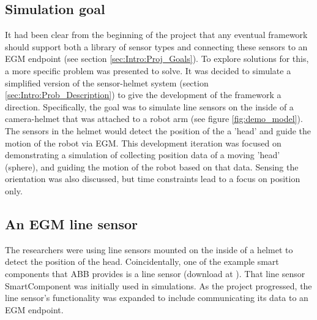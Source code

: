 \documentclass{cslthse-msc}
\begin{document}
\subsection{Simulation goal}
\label{sec:Dev:I2:demo_goal}
It had been clear from the beginning of the project that any eventual framework should support both a library of sensor types and connecting these sensors to an EGM endpoint (see section \ref{sec:Intro:Proj_Goals}). To explore solutions for this, a more specific problem was presented to solve. It was decided to simulate a simplified version of the sensor-helmet system (section \ref{sec:Intro:Prob_Description}) to give the development of the framework a direction. Specifically, the goal was to simulate line sensors on the inside of a camera-helmet that was attached to a robot arm (see figure \ref{fig:demo_model}). The sensors in the helmet would detect the position of the a 'head' and guide the motion of the robot via EGM. This development iteration was focused on demonstrating a simulation of collecting position data of a moving 'head' (sphere), and guiding the motion of the robot based on that data. Sensing the  orientation was also discussed, but time constraints lead to a focus on position only. \par
 
 \subsection{An EGM line sensor}
 \label{sec:Dev:I2:egm_line_sensor}
The researchers were using line sensors mounted on the inside of a helmet to detect the position of the head. Coincidentally, one of the example smart components that ABB provides is a line sensor (download at \cite{ABB:Line_Sensor}). That line sensor SmartComponent was initially used in simulations. As the project progressed, the line sensor's functionality was expanded to include communicating its data to an EGM endpoint. 
\end{document}
